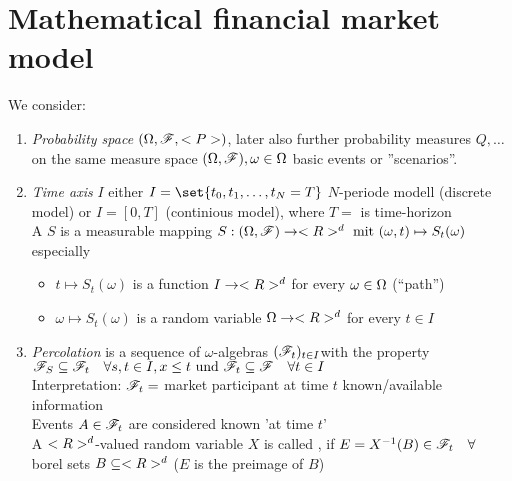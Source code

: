 \section{Mathematical financial market model}
We consider:
\begin{enumerate}
	\item \emph{Probability space} $(\Omega,\mathscr F,<P>)$, later also further probability measures $Q, \dots$ on the same measure space $(\Omega,\mathscr F), \omega \in \Omega$ basic events or ''scenarios''.
	\item \emph{Time axis} $I$ either $I=\set{t_0, t_1, \dots, t_N=T}$ $N$-periode modell (discrete model) or $I = [0,T]$ (continious model), where $T = $ is time-horizon\\
	A  $S$ is a measurable mapping $S: (\Omega,\mathscr F) \to <R>^d \text{ mit } (\omega, t) \mapsto S_t(\omega)$\\
	especially
	\begin{itemize}
		\item $t \mapsto S_t(\omega)$ is a function $I \to <R>^d$ for every $\omega \in \Omega$ (``path'')
		\item $\omega \mapsto S_t(\omega)$ is a random variable $\Omega \to <R>^d$ for every $t \in I$
	\end{itemize}
	\item \emph{Percolation} is a sequence of $\omega$-algebras $(\mathscr F_t)_{t \in I}$with the property $\mathscr F_S \subseteq \mathscr F_t \quad \forall s,t \in I, x \le t \text{ und } \mathscr F_t \subseteq \mathscr F\quad \forall t \in I$\\
	Interpretation: $\mathscr F_t=$ market participant at time $t$ known/available information\\
	Events $A \in \mathscr F_t$ are considered known 'at time $t$'\\
	A $<R>^d$-valued random variable $X$ is called , if $E = X^{-1}(B) \in \mathscr F_t \quad \forall$ borel sets $B \subseteq <R>^d$ ($E$ is the preimage of $B$)
	

\end{enumerate}
